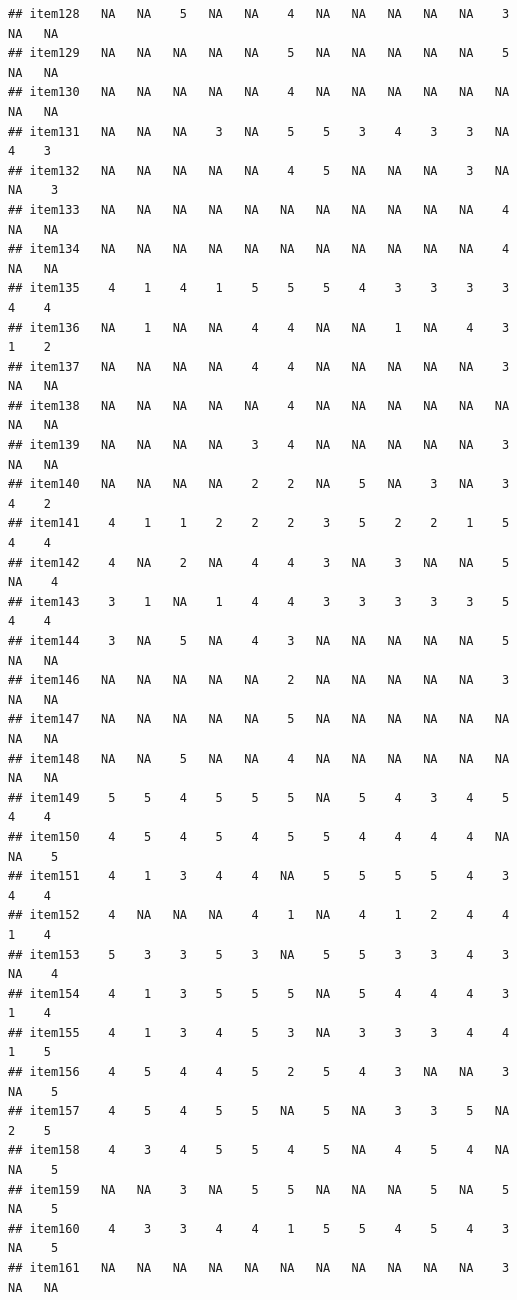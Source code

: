 \documentclass[
  man]{apa6}
\begin{document}
\begin{verbatim}
## item128   NA   NA    5   NA   NA    4   NA   NA   NA   NA   NA    3   NA   NA
## item129   NA   NA   NA   NA   NA    5   NA   NA   NA   NA   NA    5   NA   NA
## item130   NA   NA   NA   NA   NA    4   NA   NA   NA   NA   NA   NA   NA   NA
## item131   NA   NA   NA    3   NA    5    5    3    4    3    3   NA    4    3
## item132   NA   NA   NA   NA   NA    4    5   NA   NA   NA    3   NA   NA    3
## item133   NA   NA   NA   NA   NA   NA   NA   NA   NA   NA   NA    4   NA   NA
## item134   NA   NA   NA   NA   NA   NA   NA   NA   NA   NA   NA    4   NA   NA
## item135    4    1    4    1    5    5    5    4    3    3    3    3    4    4
## item136   NA    1   NA   NA    4    4   NA   NA    1   NA    4    3    1    2
## item137   NA   NA   NA   NA    4    4   NA   NA   NA   NA   NA    3   NA   NA
## item138   NA   NA   NA   NA   NA    4   NA   NA   NA   NA   NA   NA   NA   NA
## item139   NA   NA   NA   NA    3    4   NA   NA   NA   NA   NA    3   NA   NA
## item140   NA   NA   NA   NA    2    2   NA    5   NA    3   NA    3    4    2
## item141    4    1    1    2    2    2    3    5    2    2    1    5    4    4
## item142    4   NA    2   NA    4    4    3   NA    3   NA   NA    5   NA    4
## item143    3    1   NA    1    4    4    3    3    3    3    3    5    4    4
## item144    3   NA    5   NA    4    3   NA   NA   NA   NA   NA    5   NA   NA
## item146   NA   NA   NA   NA   NA    2   NA   NA   NA   NA   NA    3   NA   NA
## item147   NA   NA   NA   NA   NA    5   NA   NA   NA   NA   NA   NA   NA   NA
## item148   NA   NA    5   NA   NA    4   NA   NA   NA   NA   NA   NA   NA   NA
## item149    5    5    4    5    5    5   NA    5    4    3    4    5    4    4
## item150    4    5    4    5    4    5    5    4    4    4    4   NA   NA    5
## item151    4    1    3    4    4   NA    5    5    5    5    4    3    4    4
## item152    4   NA   NA   NA    4    1   NA    4    1    2    4    4    1    4
## item153    5    3    3    5    3   NA    5    5    3    3    4    3   NA    4
## item154    4    1    3    5    5    5   NA    5    4    4    4    3    1    4
## item155    4    1    3    4    5    3   NA    3    3    3    4    4    1    5
## item156    4    5    4    4    5    2    5    4    3   NA   NA    3   NA    5
## item157    4    5    4    5    5   NA    5   NA    3    3    5   NA    2    5
## item158    4    3    4    5    5    4    5   NA    4    5    4   NA   NA    5
## item159   NA   NA    3   NA    5    5   NA   NA   NA    5   NA    5   NA    5
## item160    4    3    3    4    4    1    5    5    4    5    4    3   NA    5
## item161   NA   NA   NA   NA   NA   NA   NA   NA   NA   NA   NA    3   NA   NA

\end{verbatim}
\end{document}
